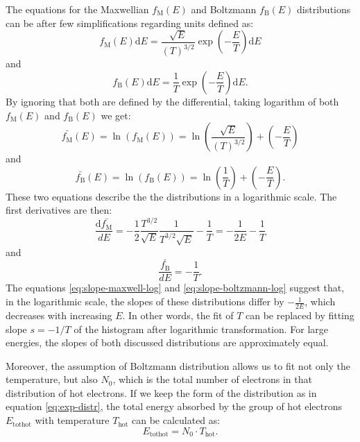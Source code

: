 The equations for the Maxwellian $f_\mathrm{M}(E)$ and Boltzmann $f_\mathrm{B}(E)$ distributions can be after few simplifications regarding units defined as:
\begin{equation}
	f_\mathrm{M}(E)\mathrm{d}E = \frac{\sqrt{E}}{(T)^{3/2}}\exp\left(-\frac{E}{T}\right)\mathrm{d}E
\end{equation}
and
\begin{equation}
	f_\mathrm{B}(E)\mathrm{d}E = \frac{1}{T}\exp\left(-\frac{E}{T}\right)\mathrm{d}E.
\end{equation}
By ignoring that both are defined by the differential, taking logarithm of both $f_\mathrm{M}(E)$ and $f_\mathrm{B}(E)$ we get:
\begin{equation}
	\bar{f_\mathrm{M}}(E) = \ln\left(f_\mathrm{M}(E)\right) = \ln\left(\frac{\sqrt{E}}{(T)^{3/2}}\right)+\left(-\frac{E}{T}\right)
\end{equation}
and
\begin{equation}
	\bar{f_\mathrm{B}}(E) = \ln\left(f_\mathrm{B}(E)\right) = \ln\left(\frac{1}{T}\right)+\left(-\frac{E}{T}\right).
\end{equation}
These two equations describe the the distributions in a logarithmic scale. The first derivatives are then:
\begin{equation}
	\label{eq:slope-maxwell-log}
	\frac{\mathrm{d}\bar{f_\mathrm{M}}}{dE} =-\frac{1}{2}\frac{T^{3/2}}{\sqrt{E}}\frac{1}{T^{3/2}\sqrt{E}}-\frac{1}{T} = -\frac{1}{2E}-\frac{1}{T}
\end{equation}
and
\begin{equation}
	\label{eq:slope-boltzmann-log}
	\frac{\bar{f_\mathrm{B}}}{dE} = -\frac{1}{T}.
\end{equation}
The equations \ref{eq:slope-maxwell-log} and \ref{eq:slope-boltzmann-log} suggest that, in the logarithmic scale, the slopes of these distributions differ by $-\frac{1}{2E}$, which decreases with increasing $E$. In other words, the fit of $T$ can be replaced by fitting slope $s = -1/T$ of the histogram after logarithmic transformation. For large energies, the slopes of both discussed distributions are approximately equal. 

Moreover, the assumption of Boltzmann distribution allows us to fit not only the temperature, but also $N_0$, which is the total number of electrons in that distribution of hot electrons. If we keep the form of the distribution as in equation \ref{eq:exp-distr}, the total energy absorbed by the group of hot electrons $E_{\mathrm{tothot}}$ with temperature $T_\mathrm{hot}$ can be calculated as:
\begin{equation}
	E_{\mathrm{tothot}} = N_0\cdot T_\mathrm{hot}.
\end{equation}


